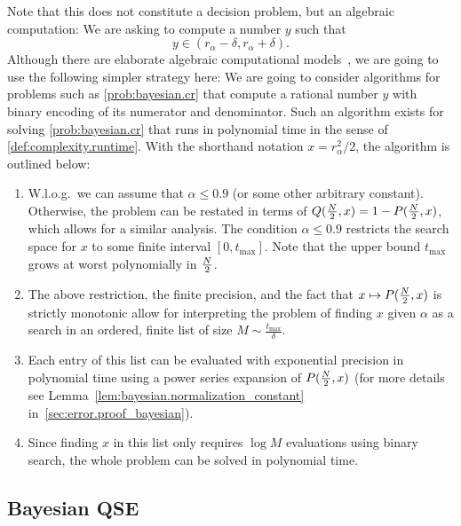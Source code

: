 Note that this does not constitute a decision problem, but an algebraic computation:
We are asking to compute a number $y$ such that
\[
  \label{eq:bayesian.precission}
  y \in (r_\alpha - \delta, r_\alpha + \delta).
\]
Although there are elaborate algebraic computational models~\cite[Sec.\ 16]{Arora_2009_Computational}, we are going to use the following simpler strategy here:
We are going to consider algorithms for problems such as \cref{prob:bayesian.cr} that compute a rational number $y$ with binary encoding of its numerator and denominator.
Such an algorithm exists for solving \cref{prob:bayesian.cr} that runs in polynomial time in the sense of \cref{def:complexity.runtime}.
With the shorthand notation $x = r^2_{\alpha}/2$, the algorithm is outlined below:
\begin{enumerate}
  \item W.l.o.g.\ we can assume that $\alpha \le 0.9$ (or some other arbitrary constant).
  Otherwise, the problem can be restated in terms of $Q(\tfrac{N}{2}, x) = 1 - P(\tfrac{N}{2}, x)$, which allows for a similar analysis.
  The condition $\alpha \le 0.9$ restricts the search space for $x$ to some finite interval $[0, t_\mathrm{max}]$.
  Note that the upper bound $t_\mathrm{max}$ grows at worst polynomially in $\tfrac{N}{2}$.
  \item The above restriction, the finite precision, and the fact that $x \mapsto P(\tfrac{N}{2}, x)$ is strictly monotonic allow for interpreting the problem of finding $x$ given $\alpha$ as a search in an ordered, finite list of size $M \sim \tfrac{t_\mathrm{max}}{\delta}$.
  \item Each entry of this list can be evaluated with exponential precision in polynomial time using a power series expansion of $P(\tfrac{N}{2}, x)$ (for more details see Lemma~\ref{lem:bayesian.normalization_constant} in~\ref{sec:error.proof_bayesian}).
  \item Since finding $x$ in this list only requires $\log M$ evaluations using binary search, the whole problem can be solved in polynomial time.
\end{enumerate}


\subsection{Bayesian QSE}
\label{sub:bayesian.tomography}


